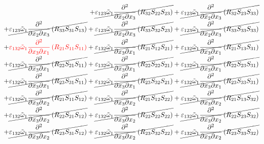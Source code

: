 \begin{equation}
\begin{split}
		+\cancel{\varepsilon_{123}\tilde{\omega}_{1}\pdv{}{x_{2}}{x_{3}}\left(R_{32}S_{22}S_{23}\right)}
		+\cancel{\varepsilon_{123}\tilde{\omega}_{1}\pdv{}{x_{2}}{x_{3}}\left(R_{32}S_{23}S_{33}\right)}\\
		+\cancel{\varepsilon_{123}\tilde{\omega}_{1}\pdv{}{x_{2}}{x_{3}}\left(R_{33}S_{31}S_{13}\right)}
		+\cancel{\varepsilon_{123}\tilde{\omega}_{1}\pdv{}{x_{2}}{x_{3}}\left(R_{33}S_{32}S_{23}\right)}
		+\cancel{\varepsilon_{123}\tilde{\omega}_{1}\pdv{}{x_{2}}{x_{3}}\left(R_{33}S_{33}S_{33}\right)}\\
		+{\color{red}\varepsilon_{132}\tilde{\omega}_{1}\pdv{}{x_{3}}{x_{1}}\left(R_{21}S_{11}S_{11}\right)}
		+\cancel{\varepsilon_{132}\tilde{\omega}_{1}\pdv{}{x_{3}}{x_{1}}\left(R_{21}S_{12}S_{21}\right)}
		+\cancel{\varepsilon_{132}\tilde{\omega}_{1}\pdv{}{x_{3}}{x_{1}}\left(R_{21}S_{13}S_{31}\right)}\\
		+\cancel{\varepsilon_{132}\tilde{\omega}_{1}\pdv{}{x_{3}}{x_{1}}\left(R_{22}S_{21}S_{11}\right)}
		+\cancel{\varepsilon_{132}\tilde{\omega}_{1}\pdv{}{x_{3}}{x_{1}}\left(R_{22}S_{22}S_{21}\right)}
		+\cancel{\varepsilon_{132}\tilde{\omega}_{1}\pdv{}{x_{3}}{x_{1}}\left(R_{22}S_{23}S_{31}\right)}\\
		+\cancel{\varepsilon_{132}\tilde{\omega}_{1}\pdv{}{x_{3}}{x_{1}}\left(R_{23}S_{31}S_{11}\right)}
		+\cancel{\varepsilon_{132}\tilde{\omega}_{1}\pdv{}{x_{3}}{x_{1}}\left(R_{23}S_{32}S_{21}\right)}
		+\cancel{\varepsilon_{132}\tilde{\omega}_{1}\pdv{}{x_{3}}{x_{1}}\left(R_{23}S_{33}S_{31}\right)}\\
		+\cancel{\varepsilon_{132}\tilde{\omega}_{1}\pdv{}{x_{3}}{x_{2}}\left(R_{21}S_{11}S_{12}\right)}
		+\cancel{\varepsilon_{132}\tilde{\omega}_{1}\pdv{}{x_{3}}{x_{2}}\left(R_{21}S_{12}S_{22}\right)}
		+\cancel{\varepsilon_{132}\tilde{\omega}_{1}\pdv{}{x_{3}}{x_{2}}\left(R_{21}S_{13}S_{32}\right)}\\
		+\cancel{\varepsilon_{132}\tilde{\omega}_{1}\pdv{}{x_{3}}{x_{2}}\left(R_{22}S_{21}S_{12}\right)}
		+\cancel{\varepsilon_{132}\tilde{\omega}_{1}\pdv{}{x_{3}}{x_{2}}\left(R_{22}S_{22}S_{22}\right)}
		+\cancel{\varepsilon_{132}\tilde{\omega}_{1}\pdv{}{x_{3}}{x_{2}}\left(R_{22}S_{23}S_{32}\right)}\\
		+\cancel{\varepsilon_{132}\tilde{\omega}_{1}\pdv{}{x_{3}}{x_{2}}\left(R_{23}S_{31}S_{12}\right)}
		+\cancel{\varepsilon_{132}\tilde{\omega}_{1}\pdv{}{x_{3}}{x_{2}}\left(R_{23}S_{32}S_{22}\right)}
		+\cancel{\varepsilon_{132}\tilde{\omega}_{1}\pdv{}{x_{3}}{x_{2}}\left(R_{23}S_{33}S_{32}\right)}\\

\end{split}
\end{equation}

